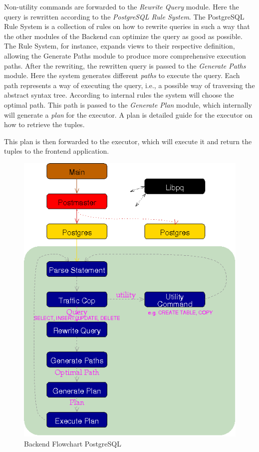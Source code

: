 Non-utility commands are forwarded to the \emph{Rewrite Query} module.
%
Here the query is rewritten according to the \emph{PostgreSQL Rule System}.
%
The PostgreSQL Rule System is a collection of rules on how to rewrite queries in such a way that the other modules of the Backend can optimize the query as good as possible.
The Rule System, for instance, expands views to their respective definition, allowing the Generate Paths module to produce more comprehensive execution paths.
%
After the rewriting, the rewritten query is passed to the \emph{Generate Paths} module.
%
Here the system generates different \emph{paths} to execute the query.
%
Each path represents a way of executing the query, i.e., a possible way of traversing the abstract syntax tree.
%
According to internal rules the system will choose the optimal path.
%
This path is passed to the \emph{Generate Plan} module, which internally will generate a \emph{plan} for the executor.
%
A plan is detailed guide for the executor on how to retrieve the tuples.

This plan is then forwarded to the executor, which will execute it and return the tuples to the frontend application.
%
\begin{figure}[!ht]
  \centering
    \includegraphics[width=1\textwidth]{img/backend_flowchart.png}
    \caption{Backend Flowchart PostgreSQL \protect \footnotemark}\label{figure:postgresql:architecture}
\end{figure}
%
